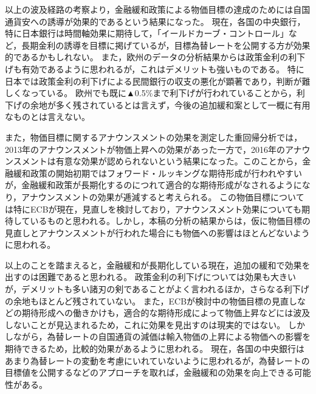 \documentclass[12pt]{jarticle}
\begin{document}
{以上の波及経路の考察より，金融緩和政策による物価目標の達成のためには自国通貨安への誘導が効果的であるという結果になった。
現在，各国の中央銀行，特に日本銀行は時間軸効果に期待して，「イールドカーブ・コントロール」など，長期金利の誘導を目標に掲げているが，目標為替レートを公開する方が効果的であるかもしれない。
また，欧州のデータの分析結果からは政策金利の利下げも有効であるように思われるが，これはデメリットも強いものである。
特に日本では政策金利の利下げによる民間銀行の収支の悪化が顕著であり，判断が難しくなっている。
欧州でも既に▲0.5\%まで利下げが行われていることから，利下げの余地が多く残されているとは言えず，今後の追加緩和案として一概に有用なものとは言えない。

また，物価目標に関するアナウンスメントの効果を測定した重回帰分析では，2013年のアナウンスメントが物価上昇への効果があった一方で，2016年のアナウンスメントは有意な効果が認められないという結果になった。このことから，金融緩和政策の開始初期ではフォワード・ルッキングな期待形成が行われやすいが，金融緩和政策が長期化するのにつれて適合的な期待形成がなされるようになり，アナウンスメントの効果が逓減すると考えられる。
この物価目標については特にECBが現在，見直しを検討しており，アナウンスメント効果についても期待しているものと思われる。しかし，本稿の分析の結果からは，仮に物価目標の見直しとアナウンスメントが行われた場合にも物価への影響はほとんどないように思われる。

以上のことを踏まえると，金融緩和が長期化している現在，追加の緩和で効果を出すのは困難であると思われる。
政策金利の利下げについては効果も大きいが，デメリットも多い諸刃の剣であることがよく言われるほか，さらなる利下げの余地もほとんど残されていない。
また，ECBが検討中の物価目標の見直しなどの期待形成への働きかけも，適合的な期待形成によって物価上昇などには波及しないことが見込まれるため，これに効果を見出すのは現実的ではない。
しかしながら，為替レートの自国通貨の減価は輸入物価の上昇による物価への影響を期待できるため，比較的効果があるように思われる。
現在，各国の中央銀行はあまり為替レートの変動を考慮にいれていないように思われるが，為替レートの目標値を公開するなどのアプローチを取れば，金融緩和の効果を向上できる可能性がある。




}
\end{document}
